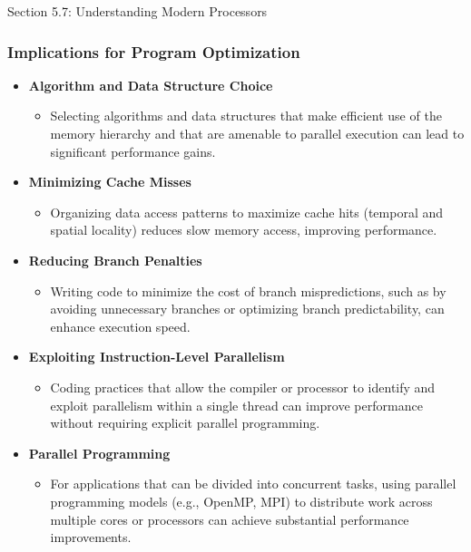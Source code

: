 \begin{notes}{Section 5.7: Understanding Modern Processors}
    \subsubsection*{Implications for Program Optimization}
    
    \begin{itemize}
        \item \textbf{Algorithm and Data Structure Choice}
        \begin{itemize}
            \item Selecting algorithms and data structures that make efficient use of the memory hierarchy and that are amenable to parallel execution can lead to significant performance gains.
        \end{itemize}
        \item \textbf{Minimizing Cache Misses}
        \begin{itemize}
            \item Organizing data access patterns to maximize cache hits (temporal and spatial locality) reduces slow memory access, improving performance.
        \end{itemize}
        \item \textbf{Reducing Branch Penalties}
        \begin{itemize}
            \item Writing code to minimize the cost of branch mispredictions, such as by avoiding unnecessary branches or optimizing branch predictability, can enhance execution speed.
        \end{itemize}
        \item \textbf{Exploiting Instruction-Level Parallelism}
        \begin{itemize}
            \item Coding practices that allow the compiler or processor to identify and exploit parallelism within a single thread can improve performance without requiring explicit parallel programming.
        \end{itemize}
        \item \textbf{Parallel Programming}
        \begin{itemize}
            \item For applications that can be divided into concurrent tasks, using parallel programming models (e.g., OpenMP, MPI) to distribute work across multiple cores or processors can achieve 
            substantial performance improvements.
        \end{itemize}
    \end{itemize}
    

\end{notes}
